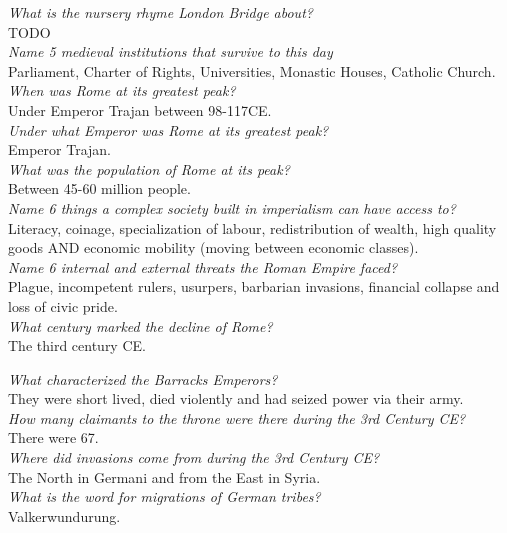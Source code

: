 \documentclass[12pt]{article}
\begin{document}
\textit{What is the nursery rhyme London Bridge about?}\\
TODO\\

\textit{Name 5 medieval institutions that survive to this day}\\
Parliament, Charter of Rights, Universities, Monastic Houses, Catholic Church.\\

\textit{When was Rome at its greatest peak?}\\
 Under Emperor Trajan between 98-117CE.\\
 
\textit{Under what Emperor was Rome at its greatest peak?}\\
Emperor Trajan.\\

\textit{What was the population of Rome at its peak?}\\
Between 45-60 million people.\\

\textit{Name 6 things a complex society built in imperialism can have access to?}\\
Literacy, coinage, specialization of labour, redistribution of wealth, high quality goods AND economic mobility (moving between economic classes).\\

\textit{Name 6 internal and external threats the Roman Empire faced?}\\
Plague, incompetent rulers, usurpers, barbarian invasions, financial collapse and loss of civic pride.\\

\textit{What century marked the decline of Rome?}\\
The third century CE.

\textit{What characterized the Barracks Emperors?}\\
They were short lived, died violently and had seized power via their army.\\

\textit{How many claimants to the throne were there during the 3rd Century CE?}\\
There were 67.\\

\textit{Where did invasions come from during the 3rd Century CE?}\\
The North in Germani and from the East in Syria.\\

\textit{What is the word for migrations of German tribes?}\\
Valkerwundurung.\\
\end{document}
